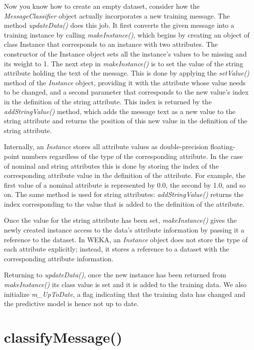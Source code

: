 Now you know how to create an empty dataset, consider how the
\textit{MessageClassifier} object actually incorporates a new training
message. The method \textit{updateData()} does this job. It first
converts the given message into a training instance by calling
\textit{makeInstance()}, which begins by creating an object of class
Instance that corresponds to an instance with two attributes. The
constructor of the Instance object sets all the instance's values to
be missing and its weight to 1. The next step in
\textit{makeInstance()} is to set the value of the string attribute
holding the text of the message. This is done by applying the
\textit{setValue()} method of the \textit{Instance} object, providing
it with the attribute whose value needs to be changed, and a second
parameter that corresponds to the new value's index in the definition
of the string attribute. This index is returned by the
\textit{addStringValue()} method, which adds the message text as a new
value to the string attribute and returns the position of this new
value in the definition of the string attribute.

Internally, an \textit{Instance} stores all attribute values as
double-precision floating-point numbers regardless of the type of the
corresponding attribute. In the case of nominal and string attributes
this is done by storing the index of the corresponding attribute value
in the definition of the attribute. For example, the first value of a
nominal attribute is represented by 0.0, the second by 1.0, and so
on. The same method is used for string attributes: \textit{addStringValue()}
returns the index corresponding to the value that is added to the
definition of the attribute.

Once the value for the string attribute has been set,
\textit{makeInstance()} gives the newly created instance access to the
data's attribute information by passing it a reference to the
dataset. In WEKA, an \textit{Instance} object does not store the type
of each attribute explicitly; instead, it stores a reference to a
dataset with the corresponding attribute information.

Returning to \textit{updateData()}, once the new instance has been
returned from \textit{makeInstance()} its class value is set and it is
added to the training data. We also initialize \textit{m\_UpToDate}, a
flag indicating that the training data has changed and the predictive
model is hence not up to date.

\section{classifyMessage()}

